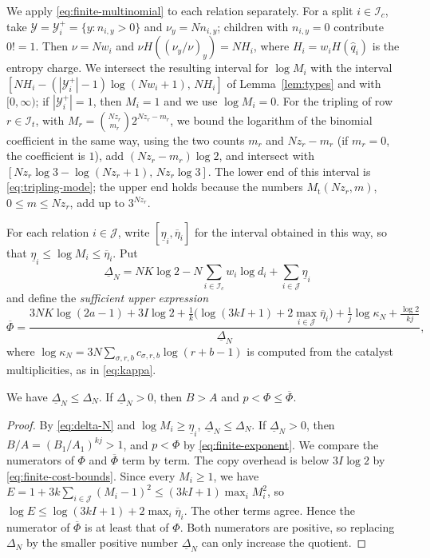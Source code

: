 We apply \eqref{eq:finite-multinomial} to each relation separately. For a
split \(i\in\mathcal I_c\), take \(\mathcal Y=\mathcal Y_i^+=\{y:n_{i,y}>0\}\)
and \(\nu_y=Nn_{i,y}\); children with \(n_{i,y}=0\) contribute \(0!=1\).
Then \(\nu=Nw_i\) and \(\nu H((\nu_y/\nu)_y)=NH_i\), where
\(H_i=w_iH(\hat q_i)\) is the entropy charge. We intersect the resulting
interval for \(\log M_i\) with the interval
\([NH_i-(|\mathcal Y_i^+|-1)\log(Nw_i+1),\,NH_i]\) of
Lemma~\ref{lem:types} and with \([0,\infty)\); if
\(|\mathcal Y_i^+|=1\), then \(M_i=1\) and we use \(\log M_i=0\). For
the tripling of row \(r\in\mathcal I_t\), with
\(M_r=\binom{Nz_r}{m_r}2^{Nz_r-m_r}\), we bound the logarithm of the
binomial coefficient in the same way, using the two counts \(m_r\) and
\(Nz_r-m_r\) (if \(m_r=0\), the coefficient is \(1\)), add
\((Nz_r-m_r)\log2\), and intersect with
\([Nz_r\log3-\log(Nz_r+1),\,Nz_r\log3]\). The lower end of this interval
is \eqref{eq:tripling-mode}; the upper end holds because the numbers
\(M_{\mathrm t}(Nz_r,m)\), \(0\le m\le Nz_r\), add up to \(3^{Nz_r}\).

For each relation \(i\in\mathcal J\), write
\([\underline\eta_i,\overline\eta_i]\) for the interval obtained in this way,
so that \(\underline\eta_i\le\log M_i\le\overline\eta_i\). Put
\begin{equation}\label{eq:lower-contraction}
 \underline\Delta_N=NK\log2-N\sum_{i\in\mathcal I_c}w_i\log d_i
 +\sum_{i\in\mathcal J}\underline\eta_i
\end{equation}
and define the \emph{sufficient upper expression}
\begin{equation}\label{eq:sufficient-expression}
 \overline\Phi=\frac{3NK\log(2a-1)+3I\log2
 +\frac1k\bigl(\log(3kI+1)+2\max_{i\in\mathcal J}\overline\eta_i\bigr)
 +\frac1j\log\kappa_N+\frac{\log2}{kj}}{\underline\Delta_N},
\end{equation}
where \(\log\kappa_N=3N\sum_{\sigma,r,b}c_{\sigma,r,b}\log(r+b-1)\) is
computed from the catalyst multiplicities, as in \eqref{eq:kappa}.

\begin{lemma}
\label{lem:sufficient-expression}
We have \(\underline\Delta_N\le\Delta_N\). If \(\underline\Delta_N>0\),
then \(B>A\) and \(p<\Phi\le\overline\Phi\).
\end{lemma}

\begin{proof}
By \eqref{eq:delta-N} and \(\log M_i\ge\underline\eta_i\),
\(\underline\Delta_N\le\Delta_N\). If \(\underline\Delta_N>0\), then
\(B/A=(B_1/A_1)^{kj}>1\), and \(p<\Phi\) by \eqref{eq:finite-exponent}.
We compare the numerators of \(\Phi\) and \(\overline\Phi\) term by term.
The copy overhead is below \(3I\log2\) by \eqref{eq:finite-cost-bounds}.
Since every \(M_i\ge1\), we have
\(E=1+3k\sum_{i\in\mathcal J}(M_i-1)^2\le(3kI+1)\max_iM_i^2\), so
\(\log E\le\log(3kI+1)+2\max_i\overline\eta_i\). The other terms agree.
Hence the numerator of \(\overline\Phi\) is at least that of \(\Phi\).
Both numerators are positive, so replacing \(\Delta_N\) by the smaller
positive number \(\underline\Delta_N\) can only increase the quotient.
\end{proof}

